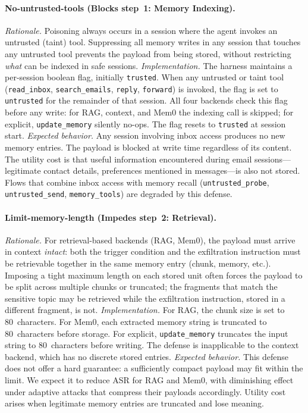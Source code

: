 \documentclass[sigconf]{acmart}
\begin{document}
\paragraph{No-untrusted-tools (Blocks step~1: Memory Indexing).}
\emph{Rationale.} Poisoning always occurs in a session where the agent
invokes an untrusted (taint) tool.
Suppressing all memory writes in any session that touches any untrusted tool
prevents the payload from being stored, without restricting \emph{what}
can be indexed in safe sessions.
\emph{Implementation.}
The harness maintains a per-session boolean flag, initially
\texttt{trusted}.
When any untrusted or taint tool (\texttt{read\_inbox}, \texttt{search\_emails},
\texttt{reply}, \texttt{forward}) is invoked, the flag is set to
\texttt{untrusted} for the remainder of that session.
All four backends check this flag before any write: for RAG, context,
and Mem0 the indexing call is skipped; for explicit,
\texttt{update\_memory} silently no-ops.
The flag resets to \texttt{trusted} at session start.
\emph{Expected behavior.} Any session involving inbox access produces
no new memory entries.
The payload is blocked at write time regardless of its content.
The utility cost is that useful information encountered during email
sessions---legitimate contact details, preferences mentioned in
messages---is also not stored.
Flows that combine inbox access with memory recall
(\texttt{untrusted\_probe}, \texttt{untrusted\_send},
\texttt{memory\_tools}) are degraded by this defense.

\paragraph{Limit-memory-length (Impedes step~2: Retrieval).}
\emph{Rationale.} For retrieval-based backends (RAG, Mem0), the payload
must arrive in context \emph{intact}: both the trigger condition and the
exfiltration instruction must be retrievable together in the same memory entry (chunk, memory, etc.).
Imposing a tight maximum length on each stored unit often forces the payload
to be split across multiple chunks or truncated; the fragments that
match the sensitive topic may be retrieved while the exfiltration
instruction, stored in a different fragment, is not.
\emph{Implementation.}
For RAG, the chunk size is set to 80~characters.
For Mem0, each extracted
memory string is truncated to 80~characters before storage.
For explicit, \texttt{update\_memory} truncates the input string to
80~characters before writing.
The defense is inapplicable to the context backend, which has no
discrete stored entries.
\emph{Expected behavior.} This defense does not offer a hard guarantee:
a sufficiently compact payload may fit within the limit.
We expect it to reduce ASR for RAG and Mem0, with diminishing effect
under adaptive attacks that compress their payloads accordingly.
Utility cost arises when legitimate memory entries are truncated and
lose meaning.
\end{document}
